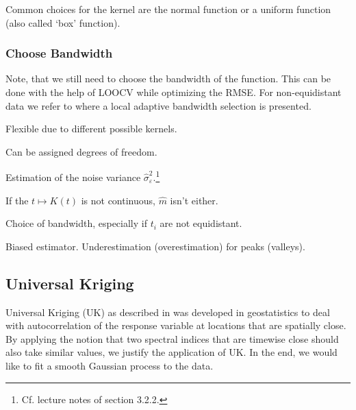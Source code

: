		Common choices for the kernel are the normal function or a uniform function (also called `box' function). 
		\subsubsection*{Choose Bandwidth}
		Note, that we still need to choose the bandwidth of the function. This can be done with the help of LOOCV while optimizing the RMSE. For non-equidistant data we refer to \cite{brockmannLocallyAdaptiveBandwidth1993} where a local adaptive bandwidth selection is presented.

		\begin{my_pros_cons_table}{
				\item Flexible due to different possible kernels.
				\item Can be assigned degrees of freedom.
				\item Estimation of the noise variance $\hat \sigma_\varepsilon^2$.\footnote{Cf. lecture notes of \cite{buhlmanComputationalStatistics2020} section 3.2.2.}
			}{
				\item If the $t \mapsto K(t)$ is not continuous, $\hat m $ isn't either.
				\item Choice of bandwidth, especially if $t_i$ are not equidistant.
				\item Biased estimator. Underestimation (overestimation) for peaks (valleys).
			}
		\end{my_pros_cons_table}


	\subsection{Universal Kriging}
		\label{sec:Kriging}

		Universal Kriging (UK) as described in \cite{diggleGaussianModelsGeostatistical2007} was developed in geostatistics to deal with autocorrelation of the response variable at locations that are spatially close. By applying the notion that two spectral indices that are timewise close should also take similar values, we justify the application of UK. In the end, we would like to fit a smooth Gaussian process to the data.

